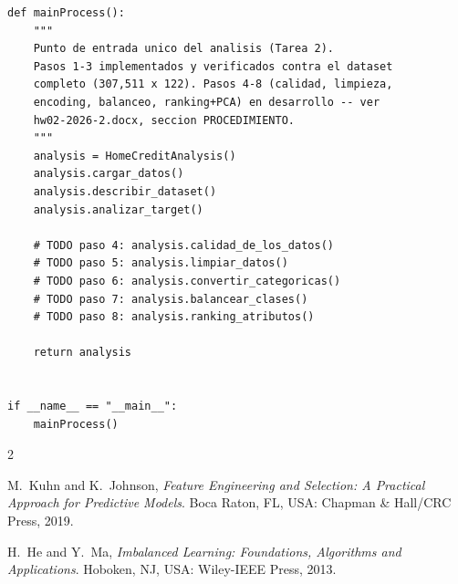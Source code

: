 \documentclass[conference]{IEEEtran}
\begin{document}
\begin{strip}
\begin{lstlisting}[caption={mainProcess -- orquestador principal del análisis}, label={lst:mainprocess}]
def mainProcess():
    """
    Punto de entrada unico del analisis (Tarea 2).
    Pasos 1-3 implementados y verificados contra el dataset
    completo (307,511 x 122). Pasos 4-8 (calidad, limpieza,
    encoding, balanceo, ranking+PCA) en desarrollo -- ver
    hw02-2026-2.docx, seccion PROCEDIMIENTO.
    """
    analysis = HomeCreditAnalysis()
    analysis.cargar_datos()
    analysis.describir_dataset()
    analysis.analizar_target()

    # TODO paso 4: analysis.calidad_de_los_datos()
    # TODO paso 5: analysis.limpiar_datos()
    # TODO paso 6: analysis.convertir_categoricas()
    # TODO paso 7: analysis.balancear_clases()
    # TODO paso 8: analysis.ranking_atributos()

    return analysis


if __name__ == "__main__":
    mainProcess()
\end{lstlisting}

\end{strip}


\begin{thebibliography}{2}

M.~Kuhn and K.~Johnson, \emph{Feature Engineering and Selection: A
Practical Approach for Predictive Models}. Boca Raton, FL, USA: Chapman
\& Hall/CRC Press, 2019.

H.~He and Y.~Ma, \emph{Imbalanced Learning: Foundations, Algorithms and
Applications}. Hoboken, NJ, USA: Wiley-IEEE Press, 2013.

\end{thebibliography}
\end{document}
